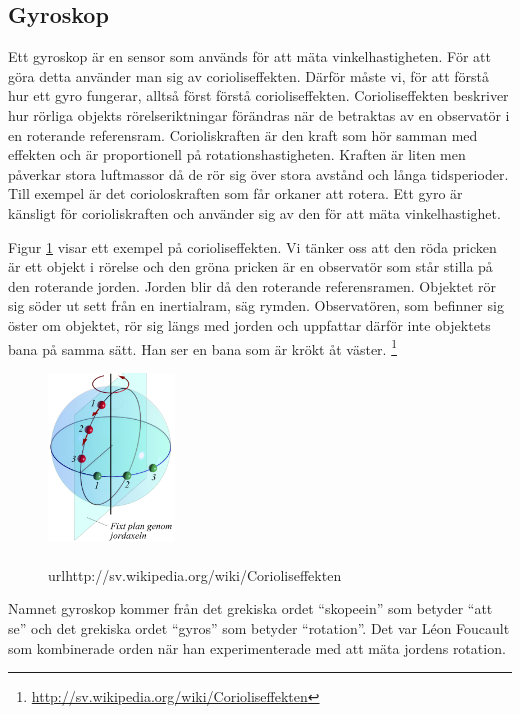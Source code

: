 \documentclass[a4paper,12pt,fleqn]{article}
\begin{document}
\subsection{Gyroskop}
Ett gyroskop är en sensor som används för att mäta vinkelhastigheten. För att göra detta använder man sig av corioliseffekten. Därför måste vi, för att förstå hur ett gyro fungerar, alltså först förstå corioliseffekten. Corioliseffekten beskriver hur rörliga objekts rörelseriktningar förändras när de betraktas av en observatör i en roterande referensram. Corioliskraften är den kraft som hör samman med effekten och är proportionell på rotationshastigheten. Kraften är liten men påverkar stora luftmassor då de rör sig över stora avstånd och långa tidsperioder. Till exempel är det corioloskraften som får orkaner att rotera. Ett gyro är känsligt för corioliskraften och använder sig av den för att mäta vinkelhastighet.

Figur \ref{fig:jord} visar ett exempel på corioliseffekten. Vi tänker oss att den röda pricken är ett objekt i rörelse och den gröna pricken är en observatör som står stilla på den roterande jorden. Jorden blir då den roterande referensramen. Objektet rör sig söder ut sett från en inertialram, säg rymden. Observatören, som befinner sig öster om objektet, rör sig längs med jorden och uppfattar därför inte objektets bana på samma sätt. Han ser en bana som är krökt åt väster.
\footnote{\url{http://sv.wikipedia.org/wiki/Corioliseffekten}}


\begin{figure}[h]
\begin{center}
\includegraphics[width=0.3\textwidth]
{Coriolisjord.png}
\caption{\\url{http://sv.wikipedia.org/wiki/Corioliseffekten}}
\label{fig:jord}
\end{center}
\end{figure}

Namnet  gyroskop kommer från det grekiska ordet “skopeein” som betyder “att se” och det grekiska ordet “gyros” som betyder “rotation”. Det var Léon Foucault som kombinerade orden när han experimenterade med att mäta jordens rotation.
\end{document}

